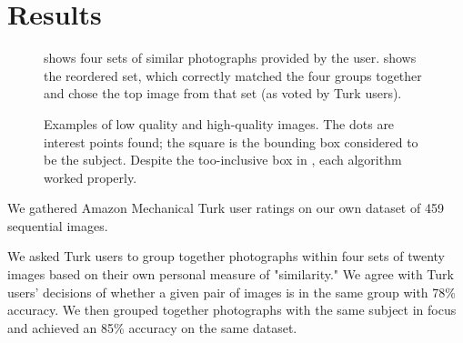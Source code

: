 \documentclass{article}
\begin{document}
\section{Results}

\begin{figure*}[t!]
\centering
{}
\caption{ shows four sets of similar photographs provided by the user.  shows the reordered set, which correctly matched the four groups together and chose the top image from that set (as voted by Turk users).}
\label{fig:ResultSorting}
\end{figure*}

\begin{figure*}[t!]
\centering
{}
\caption{Examples of  low quality and  high-quality images. The dots are interest points found; the square is the bounding box considered to be the subject. Despite the too-inclusive box in , each algorithm worked properly.}
\label{fig:Examples}
\end{figure*}

We gathered Amazon Mechanical Turk user ratings on our own dataset of 459 sequential images.


We asked Turk users to group together photographs within four sets of twenty images based on their own personal measure of "similarity." We agree with Turk users' decisions of whether a given pair of images is in the same group with 78\% accuracy. We then grouped together photographs with the same subject in focus and achieved an 85\% accuracy on the same dataset. %
\end{document}
